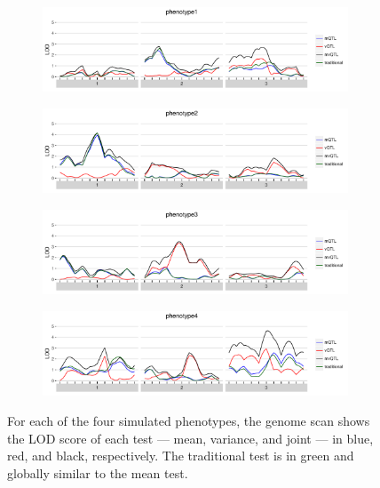 \documentclass[9pt,twocolumn,twoside]{gsag3jnl}
\begin{document}
\begin{figure}[t]
    \begin{subfigure}[b]{\linewidth}
        \includegraphics[width=\textwidth]{images/LOD_scan_phenotype1.pdf}
    \end{subfigure}
    \begin{subfigure}[b]{\linewidth}
        \includegraphics[width=\textwidth]{images/LOD_scan_phenotype2.pdf}
    \end{subfigure}
    \begin{subfigure}[b]{\linewidth}
        \includegraphics[width=\textwidth]{images/LOD_scan_phenotype3.pdf}
    \end{subfigure}
    \begin{subfigure}[b]{\linewidth}
        \includegraphics[width=\textwidth]{images/LOD_scan_phenotype4.pdf}
    \end{subfigure}
    \caption{For each of the four simulated phenotypes, the genome scan shows the LOD score of each test --- mean, variance, and joint --- in blue, red, and black, respectively.  The traditional test is in green and globally similar to the mean test. \label{fig:lod_score_scans}}
\end{figure}
\end{document}
